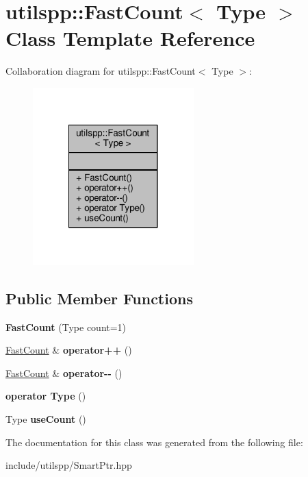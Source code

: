 \hypertarget{classutilspp_1_1FastCount}{\section{utilspp\-:\-:Fast\-Count$<$ Type $>$ Class Template Reference}
\label{classutilspp_1_1FastCount}
}


Collaboration diagram for utilspp\-:\-:Fast\-Count$<$ Type $>$\-:
\nopagebreak
\begin{figure}[H]
\begin{center}
\leavevmode
\includegraphics[width=176pt]{classutilspp_1_1FastCount__coll__graph}
\end{center}
\end{figure}
\subsection*{Public Member Functions}
\begin{DoxyCompactItemize}
\item 
\hypertarget{classutilspp_1_1FastCount_aef266176c977bb05093a5a76ff0ccee0}{{\bfseries Fast\-Count} (Type count=1)}\label{classutilspp_1_1FastCount_aef266176c977bb05093a5a76ff0ccee0}

\item 
\hypertarget{classutilspp_1_1FastCount_acbd72fe50f973ddd1c218c5266af218b}{\hyperlink{classutilspp_1_1FastCount}{Fast\-Count} \& {\bfseries operator++} ()}\label{classutilspp_1_1FastCount_acbd72fe50f973ddd1c218c5266af218b}

\item 
\hypertarget{classutilspp_1_1FastCount_ac4dbd8095fc6b8c82f3397199a180dbf}{\hyperlink{classutilspp_1_1FastCount}{Fast\-Count} \& {\bfseries operator-\/-\/} ()}\label{classutilspp_1_1FastCount_ac4dbd8095fc6b8c82f3397199a180dbf}

\item 
\hypertarget{classutilspp_1_1FastCount_aeed9ce68983113d1e74e64c17a4a9705}{{\bfseries operator Type} ()}\label{classutilspp_1_1FastCount_aeed9ce68983113d1e74e64c17a4a9705}

\item 
\hypertarget{classutilspp_1_1FastCount_a0dcf8ab9597e5b96944a0f3db1b7c1ce}{Type {\bfseries use\-Count} ()}\label{classutilspp_1_1FastCount_a0dcf8ab9597e5b96944a0f3db1b7c1ce}

\end{DoxyCompactItemize}


The documentation for this class was generated from the following file\-:\begin{DoxyCompactItemize}
\item 
include/utilspp/Smart\-Ptr.\-hpp\end{DoxyCompactItemize}
